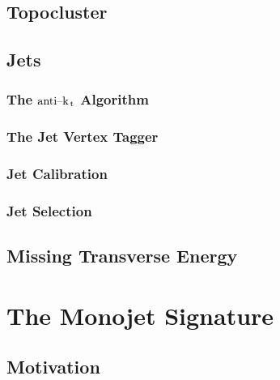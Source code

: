 \documentclass[10pt,twoside,cucitura,classica,english,openany]{toptesi}
\begin{document}
\section{Topocluster}
\label{sec:topocluster}



\section{Jets}
\label{sec:jets}



\subsection{The \emph{$\text{anti--k}_\mathrm{\, t}$} Algorithm}
\label{sec:anti-k_t}



\subsection{The Jet Vertex Tagger }
\label{sec:jet-vertex-tagger}



\subsection{Jet Calibration}
\label{sec:jet-calibration}



\subsection{Jet Selection}
\label{sec:jet-selection}



\section{Missing Transverse Energy}
\label{sec:miss-transv-energy}



\chapter{The Monojet Signature}
\label{cha:monojet-signature}

\section{Motivation}
\label{sec:motivation}
\end{document}
